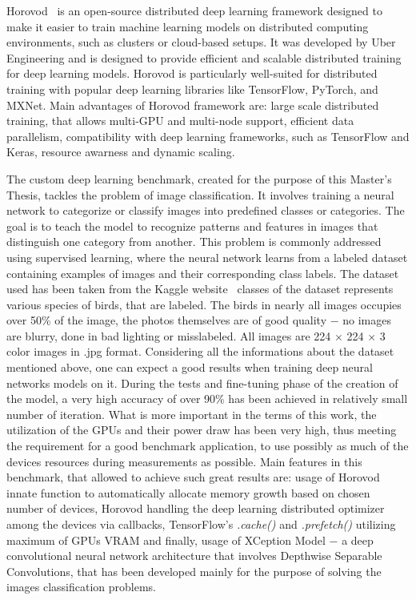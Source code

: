 Horovod~\cite{Horovod} is an open-source distributed deep learning framework
designed to make it easier to train machine learning models on distributed
computing environments, such as clusters or cloud-based setups. It was
developed by Uber Engineering and is designed to provide efficient and
scalable distributed training for deep learning models. Horovod is
particularly well-suited for distributed training with popular deep learning
libraries like TensorFlow, PyTorch, and MXNet. Main advantages of Horovod
framework are: large scale distributed training, that allows multi-GPU and
multi-node support, efficient data parallelism, compatibility with deep
learning frameworks, such as TensorFlow and Keras, resource awarness and
dynamic scaling.

The custom deep learning benchmark, created for the purpose of this Master's
Thesis, tackles the problem of image classification. It involves training
a neural network to categorize or classify images into predefined classes
or categories. The goal is to teach the model to recognize patterns and
features in images that distinguish one category from another. This problem
is commonly addressed using supervised learning, where the neural network
learns from a labeled dataset containing examples of images and their
corresponding class labels. The dataset used has been taken from the Kaggle
website~\cite{Kaggle_Dataset} classes of the dataset represents various
species of birds, that are labeled. The birds in nearly all images occupies
over 50\% of the image, the photos themselves are of good quality $-$ no images
are blurry, done in bad lighting or misslabeled. All images are 224 $\times$
224 $\times$ 3 color images in \@.jpg format. Considering all the informations
about the dataset mentioned above, one can expect a good results when training
deep neural networks models on it. During the tests and fine-tuning phase of
the creation of the model, a very high accuracy of over 90\% has been achieved
in relatively small number of iteration. What is more important in the terms
of this work, the utilization of the GPUs and their power draw has been very
high, thus meeting the requirement for a good benchmark application, to use
possibly as much of the devices resources during measurements as possible.
Main features in this benchmark, that allowed to achieve such great results
are: usage of Horovod innate function to automatically allocate memory growth
based on chosen number of devices, Horovod handling the deep learning
distributed optimizer among the devices via callbacks, TensorFlow's
\emph{.cache()} and \emph{.prefetch()} utilizing maximum of GPUs VRAM and
finally, usage of XCeption Model $-$ a deep convolutional neural network
architecture that involves Depthwise Separable Convolutions, that has been
developed mainly for the purpose of solving the images classification problems.




